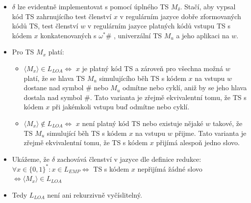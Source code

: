 \documentclass[a4paper,11pt]{article}[24.3.2010]
\begin{document}
\begin{enumerate}
\begin{itemize}
\item $\delta$ lze evidentně implementovat s pomocí úplného TS $M_{\delta}$. Stačí, aby vypsal kód TS zahrnujícího test členství $x$ v regulárním jazyce dobře zformovaných kódů TS, test členství $w$ v regulárním jazyce platných kódů vstupu TS s kódem $x$ konkatenovaných s  $\omega^*\#$ , univerzální TS $M_{u}$ a jeho aplikaci na $w$.
\item Pro TS $M_{x}$ platí:
\begin{itemize}
\item $\langle M_{x}\rangle \in L_{LOA} \Leftrightarrow$ $x$ je platný kód TS a zároveň pro všechna možná $w$ platí, že se hlava TS $M_{u}$ simulujícího běh TS s kódem $x$ na vstupu $w$ dostane nad symbol $\#$ nebo $M_{u}$ odmítne nebo cyklí, aniž by se jeho hlava dostala nad symbol $\#$. Tato varianta je zřejmě ekvivalentní tomu, že TS s kódem $x$ při jakémkoli vstupu buď odmítne nebo cyklí.
\item $\langle M_{x}\rangle \notin L_{LOA} \Leftrightarrow$ $x$ není platný kód TS nebo existuje nějaké $w$ takové, že TS $M_{u}$ simulující běh TS s kódem $x$ na vstupu $w$ přijme. Tato varianta je zřejmě ekvivalentní tomu, že TS s kódem $x$ přijímá alespoň jedno slovo.
\end{itemize}
\item Ukážeme, že $\delta$ zachovává členství v jazyce dle definice redukce:\\
$\forall x \in \{0,1\}^* : x \in L_{EMP} \Leftrightarrow$ TS s kódem $x$ nepřijímá žádné slovo $\Leftrightarrow \langle M_{x}\rangle \in L_{LOA}$
\item Tedy $L_{LOA}$ není ani rekurzivně vyčíslitelný.
\end{itemize}

\newpage


\end{enumerate}
\end{document}
